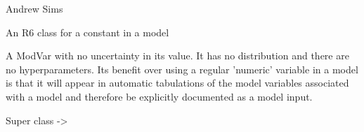 \documentclass[a4paper]{book}
\begin{document}
%
\begin{Author}\relax
Andrew Sims 
\end{Author}
%
\begin{Description}\relax
An R6 class for a constant in a model
\end{Description}
%
\begin{Details}\relax
A ModVar with no uncertainty in its value. It has no
distribution and there are no hyperparameters. Its 
benefit over using a regular 'numeric' variable in a model is that
it will appear in automatic tabulations of the model variables
associated with a model and therefore be explicitly documented
as a model input.
\end{Details}
%
\begin{Section}{Super class}
 -> 
\end{Section}
%
\end{document}
